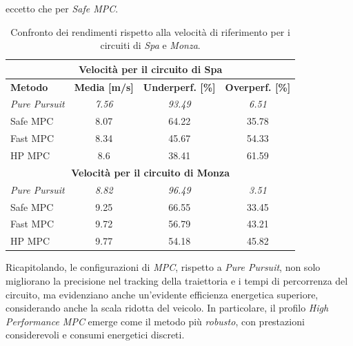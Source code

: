eccetto che per \textit{Safe MPC}.
\begin{table}[H]
\centering
\begin{tabular}{|l|c|c|c|}
\hline
\multicolumn{4}{|c|}{\textbf{Velocità per il circuito di Spa}} \\
\hline
\textbf{Metodo} & \textbf{Media [m/s]} & \textbf{Underperf. [\%]} & \textbf{Overperf. [\%]} \\
\hline
\textit{Pure Pursuit} & \textit{7.56} & \textit{93.49} & \textit{6.51} \\
\hline
Safe MPC & 8.07 & 64.22 & 35.78 \\
Fast MPC & 8.34 & 45.67 & 54.33 \\
HP MPC & 8.6 & 38.41 & 61.59 \\
\hline
\multicolumn{4}{|c|}{\textbf{Velocità per il circuito di Monza}} \\
\hline
\textit{Pure Pursuit} & \textit{8.82} & \textit{96.49} & \textit{3.51} \\
\hline
Safe MPC & 9.25 & 66.55 & 33.45 \\
Fast MPC & 9.72 & 56.79 & 43.21 \\
HP MPC & 9.77 & 54.18 & 45.82 \\
\hline
\end{tabular}
\caption{Confronto dei rendimenti rispetto alla velocità di riferimento per
i circuiti di \textit{Spa} e \textit{Monza}.}
\label{tab:spa_under_over_performance}
\end{table}
Ricapitolando, le configurazioni di \textit{MPC}, rispetto a \textit{Pure Pursuit}, non solo 
migliorano la precisione nel tracking della traiettoria e i tempi di percorrenza del circuito, ma 
evidenziano anche un'evidente efficienza energetica superiore, considerando anche la scala ridotta del veicolo. 
In particolare, il profilo \textit{High Performance MPC} emerge come il metodo più 
\textit{robusto}, con prestazioni considerevoli e consumi energetici discreti.
